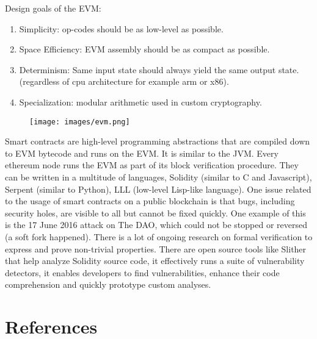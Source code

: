 \documentclass{article}
\begin{document}
Design goals of the EVM: 

\begin{enumerate}
    \item Simplicity: op-codes should be as low-level as possible.
    \item Space Efficiency: EVM assembly should be as compact as possible.
    \item Determinism: Same input state should always yield the same output state. (regardless of cpu architecture for example arm or x86).
    \item Specialization: modular arithmetic used in custom cryptography.
\end{enumerate}



\begin{figure}[hbt!]
 \centering
\texttt{[image: images/evm.png]}
\end{figure}


Smart contracts are high-level programming abstractions that are compiled down to EVM bytecode and runs on the EVM. It is similar to the JVM. Every ethereum node runs the EVM as part of its block verification procedure. They can be written in a multitude of languages, Solidity (similar to C and Javascript), Serpent (similar to Python), LLL (low-level Lisp-like language). One issue related to the usage of smart contracts on a public blockchain is that bugs, including security holes, are visible to all but cannot be fixed quickly. One example of this is the 17 June 2016 attack on The DAO, which could not be stopped or reversed (a soft fork happened). There is a lot of ongoing research on formal verification to express and prove non-trivial properties. There are open source tools like Slither that help analyze Solidity source code, it effectively runs a suite of vulnerability detectors, it enables developers to find vulnerabilities, enhance their code comprehension and quickly prototype custom analyses.












\pagebreak


\section{References}
\end{document}
